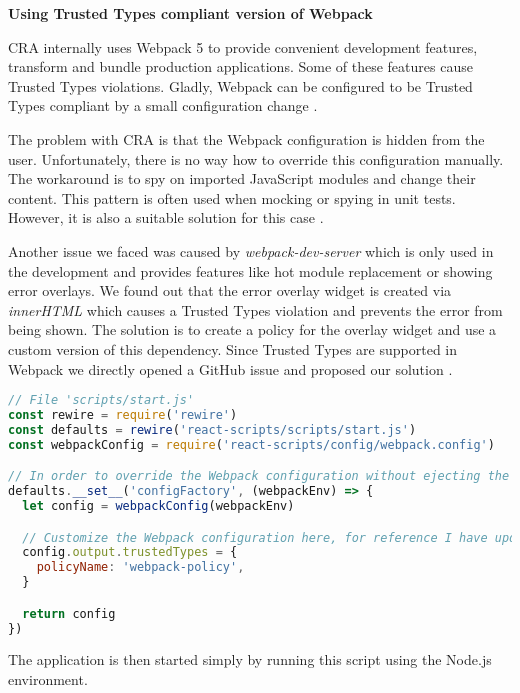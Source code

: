\medskip
\begin{flushleft}\textbf {Using Trusted Types compliant version of Webpack}\end{flushleft}
\medskip

CRA internally uses Webpack 5 to provide convenient development features, transform and bundle
production applications. Some of these features cause Trusted Types violations. Gladly, Webpack can
be configured to be Trusted Types compliant by a small configuration change
\cite{webpack_tt_config}.

The problem with CRA is that the Webpack configuration is hidden from the user. Unfortunately, there
is no way how to override this configuration manually. The workaround is to spy on imported
JavaScript modules and change their content. This pattern is often used when mocking or spying in
unit tests. However, it is also a suitable solution for this case \cite{cra_modify_webpack_config}.

Another issue we faced was caused by \emph{webpack-dev-server} which is only used in the development
and provides features like hot module replacement or showing error overlays. We found out that the
error overlay widget is created via \emph{innerHTML} which causes a Trusted Types violation and
prevents the error from being shown. The solution is to create a policy for the overlay widget and
use a custom version of this dependency. Since Trusted Types are supported in Webpack we directly
opened a GitHub issue \cite{tt_webpack_dev_server:issue} and proposed our solution
\cite{tt_webpack_dev_server:pr}.

\bigskip
\begin{lstlisting}[language=JavaScript, caption=Script to start React application with Trusted Types enabled in Webpack]
// File 'scripts/start.js'
const rewire = require('rewire')
const defaults = rewire('react-scripts/scripts/start.js')
const webpackConfig = require('react-scripts/config/webpack.config')

// In order to override the Webpack configuration without ejecting the create-react-app
defaults.__set__('configFactory', (webpackEnv) => {
  let config = webpackConfig(webpackEnv)

  // Customize the Webpack configuration here, for reference I have updated Webpack externals field
  config.output.trustedTypes = {
    policyName: 'webpack-policy',
  }

  return config
})
\end{lstlisting}

The application is then started simply by running this script using the Node.js environment.

